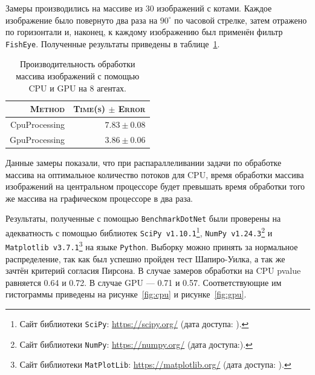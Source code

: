 Замеры производились на массиве из 30 изображений с котами. Каждое изображение было повернуто два раза на $90^{\circ}$ по часовой стрелке, затем отражено по горизонтали и, наконец, к каждому изображению был применён фильтр \texttt{FishEye}. Полученные результаты приведены в таблице~\ref{processing}.

\begin{table}[h]
\centering
    \caption{Производительность обработки массива изображений с помощью CPU и GPU на 8 агентах.}
    \begin{tabular}{| r | r |}
    \hline
        \textsc{Method} & \textsc{Time(s) $\pm$ Error} \\ 
        \hline
        CpuProcessing & $7.83 \pm 0.08$ \\ 
        GpuProcessing & $3.86 \pm 0.06$ \\
    \hline    
    \end{tabular}%
    \label{processing}
\end{table}

Данные замеры показали, что при распараллеливании задачи по обработке массива на оптимальное количество потоков для CPU, время обработки массива изображений на центральном процессоре будет превышать время обработки того же массива на графическом процессоре в два раза.

Результаты, полученные с помощью \texttt{BenchmarkDotNet} были проверены на адекватность с помощью библиотек \texttt{SciPy v1.10.1}\footnote{Сайт библиотеки \texttt{SciPy}: \url{https://scipy.org/} (дата доступа:   ).}, \texttt{NumPy v1.24.3}\footnote{Сайт библиотеки \texttt{NumPy}: \url{https://numpy.org/} (дата доступа:).} и \texttt{Matplotlib v3.7.1}\footnote{Сайт библиотеки \texttt{MatPlotLib}: \url{https://matplotlib.org/} (дата доступа:   ).} на языке \texttt{Python}. Выборку можно принять за нормальное распределение, так как был успешно пройден тест Шапиро-Уилка, а так же зачтён критерий согласия Пирсона. В случае замеров обработки на CPU pvalue равняется 0.64 и 0.72. В случае GPU --- 0.71 и 0.57. Соответствующие им гистограммы приведены на рисунке~\ref{fig:cpu} и рисунке~\ref{fig:gpu}.

